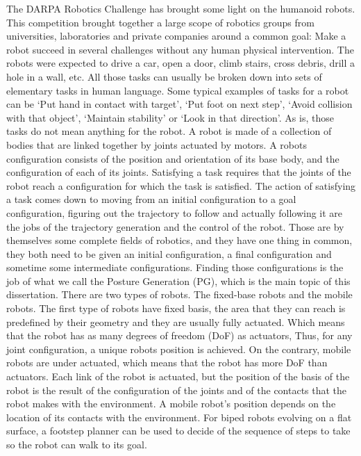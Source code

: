 The DARPA Robotics Challenge has brought some light on the humanoid robots.
This competition brought together a large scope of robotics groups from universities, laboratories and private companies around a common goal: Make a robot succeed in several challenges without any human physical intervention.
The robots were expected to drive a car, open a door, climb stairs, cross debris, drill a hole in a wall, etc.
All those tasks can usually be broken down into sets of elementary tasks in human language.
Some typical examples of tasks for a robot can be `Put hand in contact with target', `Put foot on next step', `Avoid collision with that object', `Maintain stability' or `Look in that direction'.
As is, those tasks do not mean anything for the robot.
A robot is made of a collection of bodies that are linked together by joints actuated by motors.
A robots configuration consists of the position and orientation of its base body, and the configuration of each of its joints.
Satisfying a task requires that the joints of the robot reach a configuration for which the task is satisfied.
The action of satisfying a task comes down to moving from an initial configuration to a goal configuration, figuring out the trajectory to follow and actually following it are the jobs of the trajectory generation and the control of the robot.
Those are by themselves some complete fields of robotics, and they have one thing in common, they both need to be given an initial configuration, a final configuration and sometime some intermediate configurations.
Finding those configurations is the job of what we call the Posture Generation (PG), which is the main topic of this dissertation.
There are two types of robots. The fixed-base robots and the mobile robots.
The first type of robots have fixed basis, the area that they can reach is predefined by their geometry and they are usually fully actuated.
Which means that the robot has as many degrees of freedom (DoF) as actuators, Thus, for any joint configuration, a unique robots position is achieved.
On the contrary, mobile robots are under actuated, which means that the robot has more DoF than actuators.
Each link of the robot is actuated, but the position of the basis of the robot is the result of the configuration of the joints and of the contacts that the robot makes with the environment.
A mobile robot's position depends on the location of its contacts with the environment.
For biped robots evolving on a flat surface, a footstep planner can be used to decide of the sequence of steps to take so the robot can walk to its goal.

